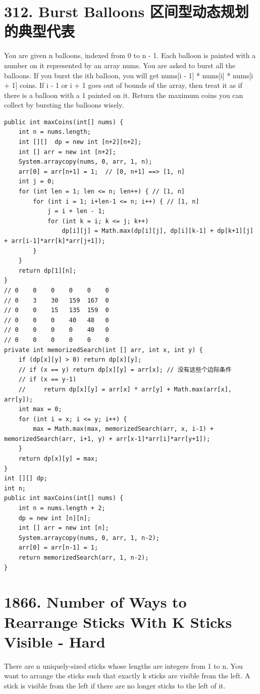 \documentclass[9pt, b5paaper]{book}
\begin{document}
\section{312. Burst Balloons 区间型动态规划的典型代表}
\label{sec-2-6}
You are given n balloons, indexed from 0 to n - 1. Each balloon is painted with a number on it represented by an array nums. You are asked to burst all the balloons.
If you burst the ith balloon, you will get nums[i - 1] * nums[i] * nums[i + 1] coins. If i - 1 or i + 1 goes out of bounds of the array, then treat it as if there is a balloon with a 1 painted on it.
Return the maximum coins you can collect by bursting the balloons wisely.
\begin{verbatim}
public int maxCoins(int[] nums) {
    int n = nums.length;
    int [][]  dp = new int [n+2][n+2];
    int [] arr = new int [n+2];
    System.arraycopy(nums, 0, arr, 1, n);
    arr[0] = arr[n+1] = 1;  // [0, n+1] ==> [1, n]
    int j = 0;
    for (int len = 1; len <= n; len++) { // [1, n]
        for (int i = 1; i+len-1 <= n; i++) { // [1, n]
            j = i + len - 1;
            for (int k = i; k <= j; k++) 
                dp[i][j] = Math.max(dp[i][j], dp[i][k-1] + dp[k+1][j] + arr[i-1]*arr[k]*arr[j+1]);
        }
    }
    return dp[1][n];
}
// 0    0    0    0    0    0
// 0    3    30   159  167  0
// 0    0    15   135  159  0
// 0    0    0    40   48   0
// 0    0    0    0    40   0
// 0    0    0    0    0    0
private int memorizedSearch(int [] arr, int x, int y) {
    if (dp[x][y] > 0) return dp[x][y];
    // if (x == y) return dp[x][y] = arr[x]; // 没有这些个边际条件
    // if (x == y-1) 
    //     return dp[x][y] = arr[x] * arr[y] + Math.max(arr[x], arr[y]);
    int max = 0;
    for (int i = x; i <= y; i++) {
        max = Math.max(max, memorizedSearch(arr, x, i-1) + memorizedSearch(arr, i+1, y) + arr[x-1]*arr[i]*arr[y+1]);
    }
    return dp[x][y] = max;
}
int [][] dp;
int n;
public int maxCoins(int[] nums) {
    int n = nums.length + 2;
    dp = new int [n][n];
    int [] arr = new int [n];
    System.arraycopy(nums, 0, arr, 1, n-2);
    arr[0] = arr[n-1] = 1;
    return memorizedSearch(arr, 1, n-2);
}
\end{verbatim}


\section{1866. Number of Ways to Rearrange Sticks With K Sticks Visible - Hard}
\label{sec-2-7}
There are n uniquely-sized sticks whose lengths are integers from 1 to n. You want to arrange the sticks such that exactly k sticks are visible from the left. A stick is visible from the left if there are no longer sticks to the left of it.
\end{document}
